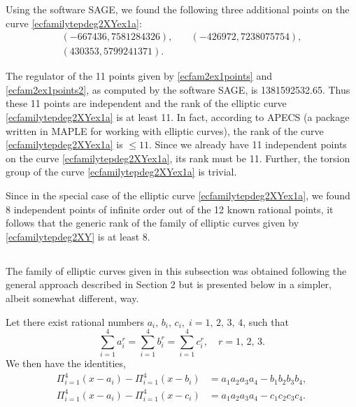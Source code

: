 \documentclass[11pt, leqno]{article}
\begin{document}
Using the software SAGE,  we  found the following three additional points  on the curve \eqref{ecfamilytepdeg2XYex1a}: 
\begin{equation}
\begin{aligned}
(-667436, 7581284326), \quad & (-426972, 7238075754), \\
(430353, 5799241371). \quad &
\end{aligned}
\label{ecfam2ex1points2}
\end{equation}

The regulator of the  11  points given by \eqref{ecfam2ex1points} and \eqref{ecfam2ex1points2}, as  computed by the software SAGE, is 1381592532.65. Thus these 11 points are independent and the rank of the elliptic curve \eqref{ecfamilytepdeg2XYex1a} is at least 11. In fact, according to APECS (a package written in MAPLE for working with elliptic curves), the rank of the curve \eqref{ecfamilytepdeg2XYex1a} is $\leq 11$. Since we already have 11 independent points on the curve \eqref{ecfamilytepdeg2XYex1a}, its rank must be 11. Further, the torsion group of the curve \eqref{ecfamilytepdeg2XYex1a} is trivial. 

Since in the special case of  the  elliptic curve \eqref{ecfamilytepdeg2XYex1a}, we found 8 independent points of infinite order out of the 12 known rational points,   it follows that  the generic rank of the family of elliptic curves given  by  \eqref{ecfamilytepdeg2XY} is at least 8. 













\subsection{}

The family of elliptic curves given in this subsection was obtained following the general approach described in Section 2 but is presented below in a simpler, albeit somewhat different, way.

	Let there exist  rational numbers $a_i,\,b_i,\,c_i,\;i=1,\,2,\,3,\,4$, such that 
\begin{equation}
\sum_{i=1}^4a_i^r=\sum_{i=1}^4b_i^r=\sum_{i=1}^4c_i^r,\quad r=1,\,2,\,3. \label{tepdeg3chn1}
\end{equation}
We then have the identities,
\begin{align}
\Pi_{i=1}^4(x-a_i)-\Pi_{i=1}^4(x-b_i)&=a_1a_2a_3a_4-b_1b_2b_3b_4,\label{ident1ab}\\
\Pi_{i=1}^4(x-a_i)-\Pi_{i=1}^4(x-c_i)&=a_1a_2a_3a_4-c_1c_2c_3c_4.\label{ident1ac}
\end{align}
\end{document}

